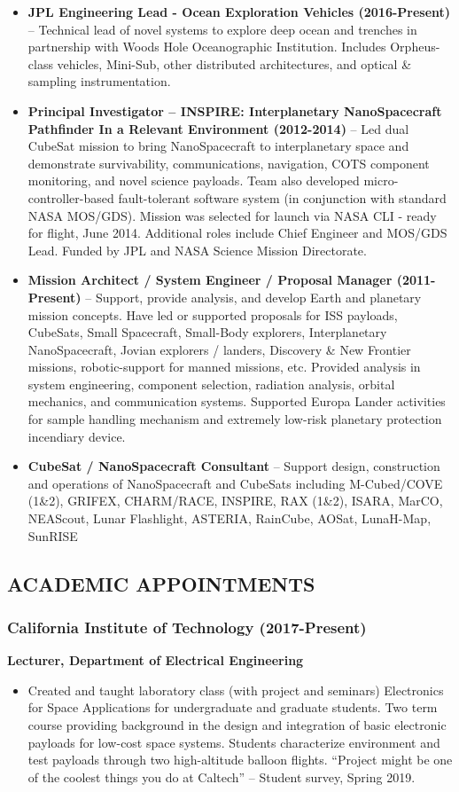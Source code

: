 \documentclass[11pt,letterpaper]{article}
\begin{document}
\begin{itemize}
\item \textbf{JPL Engineering Lead - Ocean Exploration Vehicles (2016-Present)} – Technical lead of novel systems to explore deep ocean and trenches in partnership with Woods Hole Oceanographic Institution. Includes Orpheus-class vehicles, Mini-Sub, other distributed architectures, and optical \& sampling instrumentation.
\item \textbf{Principal Investigator – INSPIRE: Interplanetary NanoSpacecraft Pathfinder In a Relevant Environment (2012-2014)} – Led dual CubeSat mission to bring NanoSpacecraft to interplanetary space and demonstrate survivability, communications, navigation, COTS component monitoring, and novel science payloads. Team also developed micro-controller-based fault-tolerant software system (in conjunction with standard NASA MOS/GDS). Mission was selected for launch via NASA CLI - ready for flight, June 2014. Additional roles include Chief Engineer and MOS/GDS Lead. Funded by JPL and NASA Science Mission Directorate.
\item \textbf{Mission Architect / System Engineer / Proposal Manager (2011-Present)} – Support, provide analysis, and develop Earth and planetary mission concepts. Have led or supported proposals for ISS payloads, CubeSats, Small Spacecraft, Small-Body explorers, Interplanetary NanoSpacecraft, Jovian explorers / landers, Discovery \& New Frontier missions, robotic-support for manned missions, etc. Provided analysis in system engineering, component selection, radiation analysis, orbital mechanics, and communication systems. Supported Europa Lander activities for sample handling mechanism and extremely low-risk planetary protection incendiary device.
\item \textbf{CubeSat / NanoSpacecraft Consultant} – Support design, construction and operations of NanoSpacecraft and CubeSats including M-Cubed/COVE (1\&2), GRIFEX, CHARM/RACE, INSPIRE, RAX (1\&2), ISARA, MarCO, NEAScout, Lunar Flashlight, ASTERIA, RainCube, AOSat, LunaH-Map, SunRISE
\end{itemize}

\subsection*{ACADEMIC APPOINTMENTS}
\subsubsection*{California Institute of Technology (2017-Present)}
\textbf{Lecturer, Department of Electrical Engineering}
\begin{itemize}
\item Created and taught laboratory class (with project and seminars) Electronics for Space Applications for undergraduate and graduate students. Two term course providing background in the design and integration of basic electronic payloads for low-cost space systems. Students characterize environment and test payloads through two high-altitude balloon flights. “Project might be one of the coolest things you do at Caltech” – Student survey, Spring 2019.
\end{itemize}
\end{document}

